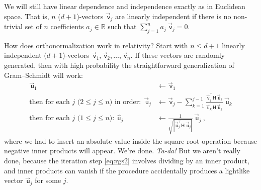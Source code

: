 \documentclass{article}
\newcommand{\metric}{\mathsf{H}}
\newcommand\upvec[1]{\!\vec{\,\mathrm{#1}}}
\newcommand{\Lvec}[1]{\upvec{\mathsf{#1}}} %
\newcommand{\Lhat}[1]{\hat{\mathsf{#1}}} %
\newcommand{\plus}{\!+\!} %
\begin{document}
We will still have linear dependence and independence exactly as in Euclidean space.
That is, $n$ ($d\plus1$)-vectors $\Lvec{v}_j$ are linearly independent if there is no non-trivial set of $n$ coefficients $a_j\in\mathbb{R}$ such that $\sum_{j=1}^n a_j\,\Lvec{v}_j = 0$.

How does orthonormalization work in relativity?
Start with $n\leq d+1$ linearly independent ($d\plus1$)-vectors $\Lvec{v}_1,\Lvec{v}_2,\ldots,\Lvec{v}_n$.
If these vectors are randomly generated, then with high probability the straightforward generalization of Gram--Schmidt will work:
\begin{align}
    \Lvec{u}_1 &\leftarrow \Lvec{v}_1 \label{eq:rgs1}
    \\
    \mbox{then for each $j$ ($2\leq j\leq n$) in order:} ~~ \Lvec{u}_j &\leftarrow \Lvec{v}_j - \sum_{k=1}^{j-1} \frac{\Lvec{v}_j^\top\metric\,\Lvec{u}_k}{\Lvec{u}_k^\top\metric\,\Lvec{u}_k}\,\Lvec{u}_k \label{eq:rgs2}
    \\
    \mbox{then for each $j$ ($1\leq j\leq n$):} ~~ \Lhat{u}_j &\leftarrow \frac{1}{\sqrt{|\Lvec{u}_j^\top\metric\,\Lvec{u}_j|}}\,\Lvec{u}_j ~, \label{eq:rgs3}
\end{align}
where we had to insert an absolute value inside the square-root operation because negative inner products will appear.
We're done. \emph{Ta-da!}
But we aren't really done, because the iteration step \eqref{eq:rgs2} involves dividing by an inner product, and inner products can vanish if the procedure accidentally produces a lightlike vector $\Lvec{u}_j$ for some $j$.
\end{document}
